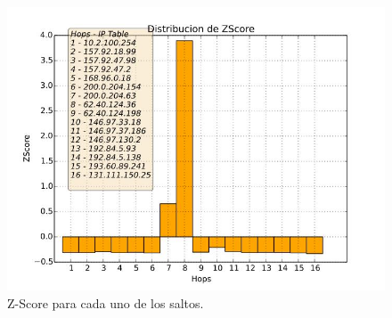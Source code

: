 \begin{figure}[H]
  \centering	
	\includegraphics[scale=0.4]{../cambridge-experiment/bar_z_score.jpeg}
  \caption{Z-Score para cada uno de los saltos.}
	\label{fig:histo-src-sitiotrabajo}
\end{figure}

